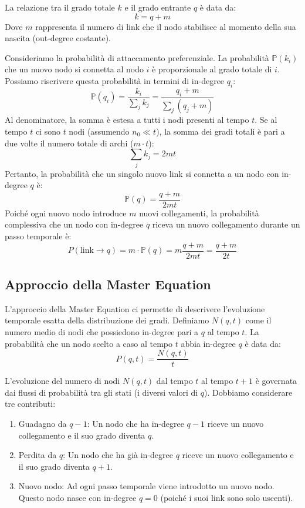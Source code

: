 La relazione tra il grado totale $k$ e il grado entrante $q$ è data da:
\begin{equation}
    k = q + m
\end{equation}
Dove $m$ rappresenta il numero di link che il nodo stabilisce al momento della sua nascita (out-degree costante).

Consideriamo la probabilità di attaccamento preferenziale. La probabilità $\mathbb{P}(k_i)$ che un nuovo nodo si connetta al nodo $i$ è proporzionale al grado totale di $i$. Possiamo riscrivere questa probabilità in termini di in-degree $q_i$:
\begin{equation}
    \mathbb{P}(q_i) = \frac{k_i}{\sum_j k_j} = \frac{q_i + m}{\sum_j (q_j + m)}
\end{equation}
Al denominatore, la somma è estesa a tutti i nodi presenti al tempo $t$. Se al tempo $t$ ci sono $t$ nodi (assumendo $n_0 \ll t$), la somma dei gradi totali è pari a due volte il numero totale di archi ($m \cdot t$):
\begin{equation}
    \sum_j k_j = 2 m t
\end{equation}
Pertanto, la probabilità che un singolo nuovo link si connetta a un nodo con in-degree $q$ è:
\begin{equation}
    \mathbb{P}(q) = \frac{q + m}{2 m t}
\end{equation}
Poiché ogni nuovo nodo introduce $m$ nuovi collegamenti, la probabilità complessiva che un nodo con in-degree $q$ riceva un nuovo collegamento durante un passo temporale è:
\begin{equation}
    P(\text{link} \to q) = m \cdot \mathbb{P}(q) = m \frac{q + m}{2 m t} = \frac{q + m}{2 t}
\end{equation}

\subsection{Approccio della Master Equation}

L'approccio della Master Equation ci permette di descrivere l'evoluzione temporale esatta della distribuzione dei gradi.
Definiamo $N(q, t)$ come il numero medio di nodi che possiedono in-degree pari a $q$ al tempo $t$.
La probabilità che un nodo scelto a caso al tempo $t$ abbia in-degree $q$ è data da:
\begin{equation}
    P(q, t) = \frac{N(q, t)}{t}
\end{equation}

L'evoluzione del numero di nodi $N(q, t)$ dal tempo $t$ al tempo $t+1$ è governata dai flussi di probabilità tra gli stati (i diversi valori di $q$).
Dobbiamo considerare tre contributi:
\begin{enumerate}
    \item Guadagno da $q-1$: Un nodo che ha in-degree $q-1$ riceve un nuovo collegamento e il suo grado diventa $q$.
    \item Perdita da $q$: Un nodo che ha già in-degree $q$ riceve un nuovo collegamento e il suo grado diventa $q+1$.
    \item Nuovo nodo: Ad ogni passo temporale viene introdotto un nuovo nodo. Questo nodo nasce con in-degree $q=0$ (poiché i suoi link sono solo uscenti).
\end{enumerate}

